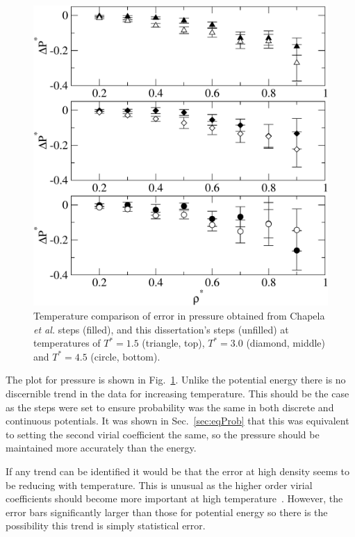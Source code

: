 \documentclass[12pt]{UoAthesis} \usepackage{booktabs}
\begin{document}
\begin{figure}[htp] 
  \begin{center}
    \includegraphics[clip,scale=0.45]{figures/TempP} 
    \caption[Temperature comparison of pressure between
    previous steps and this dissertations steps]
    {Temperature comparison of error in pressure obtained from
      Chapela \textit{et al.} steps (filled), and this dissertation's
      steps (unfilled) at temperatures of $T^*=1.5$ (triangle, top),
      $T^*=3.0$ (diamond, middle) and $T^*=4.5$ (circle, bottom).}
    \label{fig:tempP}
  \end{center}
\end{figure}

The plot for pressure is shown in Fig.~\ref{fig:tempP}. Unlike the
potential energy there is no discernible trend in the data for
increasing temperature.  This should be the case as the steps were set
to ensure probability was the same in both discrete and continuous
potentials.  It was shown in Sec.~\ref{sec:eqProb} that this was
equivalent to setting the second virial coefficient the same, so the
pressure should be maintained more accurately than the energy.  

If any trend can be identified it would be that the error at high
density seems to be reducing with temperature.  This is unusual as the
higher order virial coefficients should become more important at high
temperature~\cite{Sun1996}. However, the error bars significantly
larger than those for potential energy so there is the possibility
this trend is simply statistical error.
\end{document}
